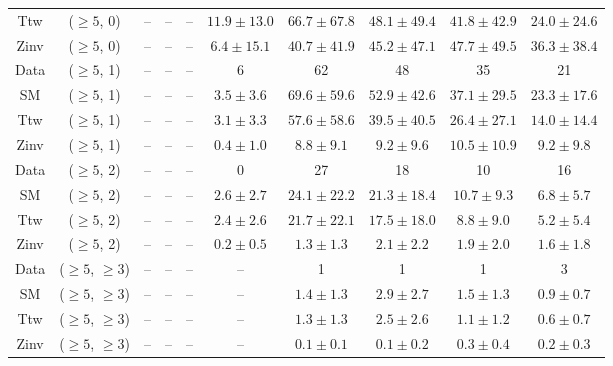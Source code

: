 \begin{table}[h!]
{\begin{tabular}{cccccccccc}
	Ttw & ($\ge5$, 0) & -- & -- & -- & $11.9\pm 13.0$ & $66.7\pm 67.8$ & $48.1\pm 49.4$ & $41.8\pm 42.9$ & $24.0\pm 24.6$ \\[0.5ex] 
	Zinv & ($\ge5$, 0) & -- & -- & -- & $6.4\pm 15.1$ & $40.7\pm 41.9$ & $45.2\pm 47.1$ & $47.7\pm 49.5$ & $36.3\pm 38.4$ \\[0.5ex] 
	Data & ($\ge5$, 1) & -- & -- & -- & 6 & 62 & 48 & 35 & 21 \\[0.5ex] 
	SM & ($\ge5$, 1) & -- & -- & -- & $3.5\pm 3.6$ & $69.6\pm 59.6$ & $52.9\pm 42.6$ & $37.1\pm 29.5$ & $23.3\pm 17.6$ \\[0.5ex] 
	Ttw & ($\ge5$, 1) & -- & -- & -- & $3.1\pm 3.3$ & $57.6\pm 58.6$ & $39.5\pm 40.5$ & $26.4\pm 27.1$ & $14.0\pm 14.4$ \\[0.5ex] 
	Zinv & ($\ge5$, 1) & -- & -- & -- & $0.4\pm 1.0$ & $8.8\pm 9.1$ & $9.2\pm 9.6$ & $10.5\pm 10.9$ & $9.2\pm 9.8$ \\[0.5ex] 
	Data & ($\ge5$, 2) & -- & -- & -- & 0 & 27 & 18 & 10 & 16 \\[0.5ex] 
	SM & ($\ge5$, 2) & -- & -- & -- & $2.6\pm 2.7$ & $24.1\pm 22.2$ & $21.3\pm 18.4$ & $10.7\pm 9.3$ & $6.8\pm 5.7$ \\[0.5ex] 
	Ttw & ($\ge5$, 2) & -- & -- & -- & $2.4\pm 2.6$ & $21.7\pm 22.1$ & $17.5\pm 18.0$ & $8.8\pm 9.0$ & $5.2\pm 5.4$ \\[0.5ex] 
	Zinv & ($\ge5$, 2) & -- & -- & -- & $0.2\pm 0.5$ & $1.3\pm 1.3$ & $2.1\pm 2.2$ & $1.9\pm 2.0$ & $1.6\pm 1.8$ \\[0.5ex] 
	Data & ($\ge5$, $\ge3$) & -- & -- & -- & -- & 1 & 1 & 1 & 3 \\[0.5ex] 
	SM & ($\ge5$, $\ge3$) & -- & -- & -- & -- & $1.4\pm 1.3$ & $2.9\pm 2.7$ & $1.5\pm 1.3$ & $0.9\pm 0.7$ \\[0.5ex] 
	Ttw & ($\ge5$, $\ge3$) & -- & -- & -- & -- & $1.3\pm 1.3$ & $2.5\pm 2.6$ & $1.1\pm 1.2$ & $0.6\pm 0.7$ \\[0.5ex] 
	Zinv & ($\ge5$, $\ge3$) & -- & -- & -- & -- & $0.1\pm 0.1$ & $0.1\pm 0.2$ & $0.3\pm 0.4$ & $0.2\pm 0.3$ \\[0.5ex] 
	\hline
	\hline
\end{tabular}}
\end{table}

